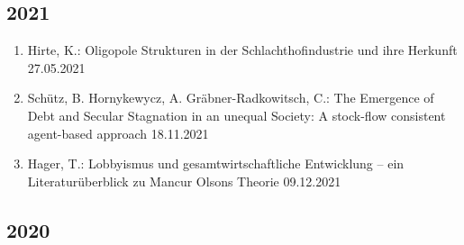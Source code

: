 \subsection*{2021}
\begin{enumerate}
	\item Hirte, K.: Oligopole Strukturen in der Schlachthofindustrie und ihre Herkunft 27.05.2021
	\item Schütz, B. Hornykewycz, A. Gräbner-Radkowitsch, C.: The Emergence of Debt and Secular Stagnation in an unequal Society: A stock-flow consistent agent-based approach 18.11.2021
	\item Hager, T.: Lobbyismus und gesamtwirtschaftliche Entwicklung – ein Literaturüberblick zu Mancur Olsons Theorie 09.12.2021
\end{enumerate}
\subsection*{2020}
